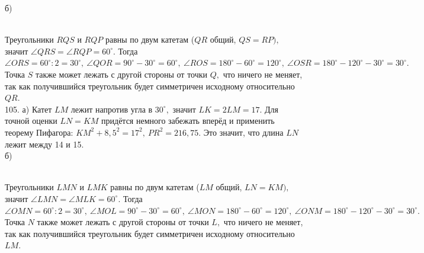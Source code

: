 \documentclass[12pt]{article}
\begin{document}
б)\begin{figure}[ht!]
\end{figure}\\
Треугольники $RQS$ и $RQP$ равны по двум катетам ($QR$ общий, $QS=RP),$ значит $\angle QRS=\angle RQP=60^\circ.$ Тогда $\angle ORS=60^\circ:2=30^\circ,\ \angle QOR=90^\circ-30^\circ=60^\circ,\ \angle ROS=180^\circ-60^\circ=120^\circ,\ \angle OSR=180^\circ-120^\circ-30^\circ=30^\circ.$ Точка $S$ также может лежать с другой стороны от точки $Q,$ что ничего не меняет, так как получившийся треугольник будет симметричен исходному относительно $QR.$\\
105. а) Катет $LM$ лежит напротив угла в $30^\circ,$ значит $LK=2LM=17.$ Для точной оценки $LN=KM$ придётся немного забежать вперёд и применить теорему Пифагора: $KM^2+8,5^2=17^2,\ PR^2=216,75.$ Это значит, что длина $LN$ лежит между 14 и 15.\\
б)\begin{figure}[ht!]
\end{figure}\\
Треугольники $LMN$ и $LMK$ равны по двум катетам ($LM$ общий, $LN=KM),$ значит $\angle LMN=\angle MLK=60^\circ.$ Тогда $\angle OMN=60^\circ:2=30^\circ,\ \angle MOL=90^\circ-30^\circ=60^\circ,\ \angle MON=180^\circ-60^\circ=120^\circ,\ \angle ONM=180^\circ-120^\circ-30^\circ=30^\circ.$ Точка $N$ также может лежать с другой стороны от точки $L,$ что ничего не меняет, так как получившийся треугольник будет симметричен исходному относительно $LM.$\\
\end{document}
